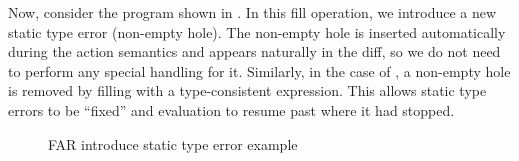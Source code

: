 Now, consider the program shown in . In this fill operation, we introduce a new static type error (non-empty hole). The non-empty hole is inserted automatically during the action semantics and appears naturally in the diff, so we do not need to perform any special handling for it. Similarly, in the case of , a non-empty hole is removed by filling with a type-consistent expression. This allows static type errors to be ``fixed'' and evaluation to resume past where it had stopped.

\begin{figure}
  \centering
  \begin{singlespace}
    \vspace{10pt}
    \vspace{10pt}
  \end{singlespace}
  \caption{FAR introduce static type error example}
  \label{fig:far-introduce-type-error}
\end{figure}

